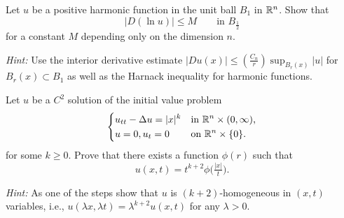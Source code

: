 \begin{problem}
  Let \(u\) be a positive harmonic function in the unit ball \(B_1\) in
  \(\mathbb{R}^n\). Show that
  \[
    \bigl|D(\ln u)\bigr|\leq M\qquad \text{in \(B_{\frac{1}{2}}\)}
  \]
  for a constant \(M\) depending only on the dimension \(n\).

  \noindent\emph{Hint:} Use the interior derivative estimate
  \(\bigl|Du(x)\bigr|\leq(\frac{C_n}{r})\sup_{B_r(x)}|u|\) for
  \(B_r(x)\subset B_1\) as well as the Harnack inequality for harmonic
  functions.
\end{problem}
\begin{solution*}
\end{solution*}

\begin{problem}
  Let \(u\) be a \(C^2\) solution of the initial value problem
  \[
    \left\{
    \begin{aligned}
      &u_{tt}-\Delta u=|x|^k&&\text{in \(\mathbb{R}^n\times(0,\infty)\),}\\
      &u=0,u_t=0&&\text{on \(\mathbb{R}^n\times\{0\}\)}.
    \end{aligned}
    \right.
  \]
  for some \(k\geq 0\). Prove that there exists a function \(\phi(r)\)
  such that
  \[
    u(x,t)=t^{k+2}\phi\bigl(\tfrac{|x|}{t}\bigr).
  \]

  \noindent\emph{Hint:} As one of the steps show that \(u\) is \((k+2)\)-homogeneous
  in \((x,t)\) variables, i.e.,
  \(u(\lambda x,\lambda t)=\lambda^{k+2}u(x,t)\) for any \(\lambda >0\).
\end{problem}
\begin{solution*}
\end{solution*}

